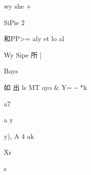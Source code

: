\documentclass[UTF8,12pt,a4paper,openany]{ctexbook}
\begin{document}
\begin{enumerate}[label=\textbf{\arabic*.},leftmargin=2em]
     wy     she  +\par SiPie 2\par 和PP>= aly   et lo al\par Wy            Sipe  所 |\par Bays\par 如 出 ls    MT ayo  \& Y=  \textasciitilde{} *k\par a7\par a       y\par y), A 4  ak\par Xr\par s                 
\end{enumerate}
\end{document}

